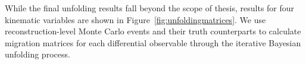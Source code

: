 While the final unfolding results fall beyond the scope of thesis, results for four kinematic variables are shown in Figure~\ref{fig:unfoldingmatrices}. We use reconstruction-level Monte Carlo events and their truth counterparts to calculate migration matrices for each differential observable through the iterative Bayesian unfolding process. 

\begin{figure}[!h]
\centering
  \hfill
  \hfill
  \hfill
\end{figure}

